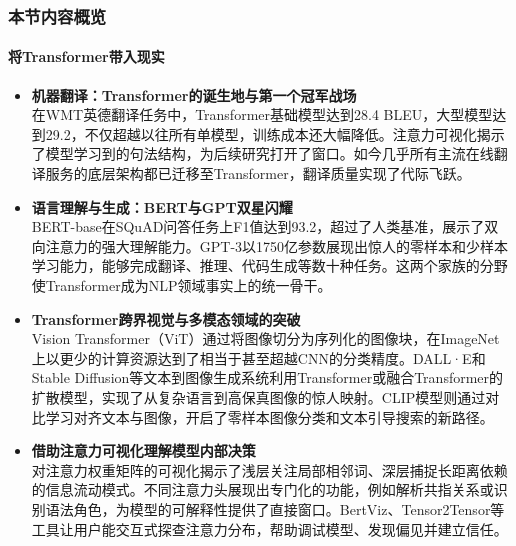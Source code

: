 \documentclass[11pt]{beamer}
\begin{document}
\begin{frame}
\frametitle{本节内容概览}
\framesubtitle{将Transformer带入现实}

\begin{itemize}
    \item \textbf{机器翻译：Transformer的诞生地与第一个冠军战场} \\
    在WMT英德翻译任务中，Transformer基础模型达到28.4 BLEU，大型模型达到29.2，不仅超越以往所有单模型，训练成本还大幅降低。注意力可视化揭示了模型学习到的句法结构，为后续研究打开了窗口。如今几乎所有主流在线翻译服务的底层架构都已迁移至Transformer，翻译质量实现了代际飞跃。
    
    \item \textbf{语言理解与生成：BERT与GPT双星闪耀} \\
    BERT-base在SQuAD问答任务上F1值达到93.2，超过了人类基准，展示了双向注意力的强大理解能力。GPT-3以1750亿参数展现出惊人的零样本和少样本学习能力，能够完成翻译、推理、代码生成等数十种任务。这两个家族的分野使Transformer成为NLP领域事实上的统一骨干。
    
    \item \textbf{Transformer跨界视觉与多模态领域的突破} \\
    Vision Transformer（ViT）通过将图像切分为序列化的图像块，在ImageNet上以更少的计算资源达到了相当于甚至超越CNN的分类精度。DALL·E和Stable Diffusion等文本到图像生成系统利用Transformer或融合Transformer的扩散模型，实现了从复杂语言到高保真图像的惊人映射。CLIP模型则通过对比学习对齐文本与图像，开启了零样本图像分类和文本引导搜索的新路径。
    
    \item \textbf{借助注意力可视化理解模型内部决策} \\
    对注意力权重矩阵的可视化揭示了浅层关注局部相邻词、深层捕捉长距离依赖的信息流动模式。不同注意力头展现出专门化的功能，例如解析共指关系或识别语法角色，为模型的可解释性提供了直接窗口。BertViz、Tensor2Tensor等工具让用户能交互式探查注意力分布，帮助调试模型、发现偏见并建立信任。
\end{itemize}
\end{frame}
\end{document}
